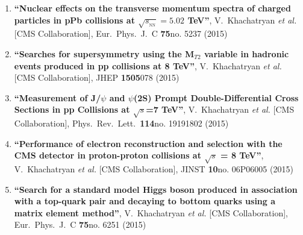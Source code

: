 \begin{enumerate}
\item%
{\bf ``Nuclear effects on the transverse momentum spectra of charged particles in pPb collisions at $\sqrt{s_{_\mathrm {NN}}} =5.02$ TeV''}, 
  V.~Khachatryan {\it et al.}  [CMS Collaboration], 
Eur.\ Phys.\ J.\ C {\bf 75}no. 5237 (2015) %


\item%
{\bf ``Searches for supersymmetry using the M$_{T2}$ variable in hadronic events produced in pp collisions at 8 TeV''}, 
  V.~Khachatryan {\it et al.}  [CMS Collaboration], 
JHEP {\bf 1505}078 (2015) %


\item%
{\bf ``Measurement of J/$\psi$ and $\psi$(2S) Prompt Double-Differential Cross Sections in pp Collisions at $\sqrt{s}$=7 TeV''}, 
  V.~Khachatryan {\it et al.}  [CMS Collaboration], 
Phys.\ Rev.\ Lett.\  {\bf 114}no. 19191802 (2015) %


\item%
{\bf ``Performance of electron reconstruction and selection with the CMS detector in proton-proton collisions at $\sqrt{s}$ = 8  TeV''}, 
  V.~Khachatryan {\it et al.}  [CMS Collaboration], 
JINST {\bf 10}no. 06P06005 (2015) %


\item%
{\bf ``Search for a standard model Higgs boson produced in association with a top-quark pair and decaying to bottom quarks using a matrix element method''}, 
  V.~Khachatryan {\it et al.}  [CMS Collaboration], 
Eur.\ Phys.\ J.\ C {\bf 75}no. 6251 (2015) %



\end{enumerate}

